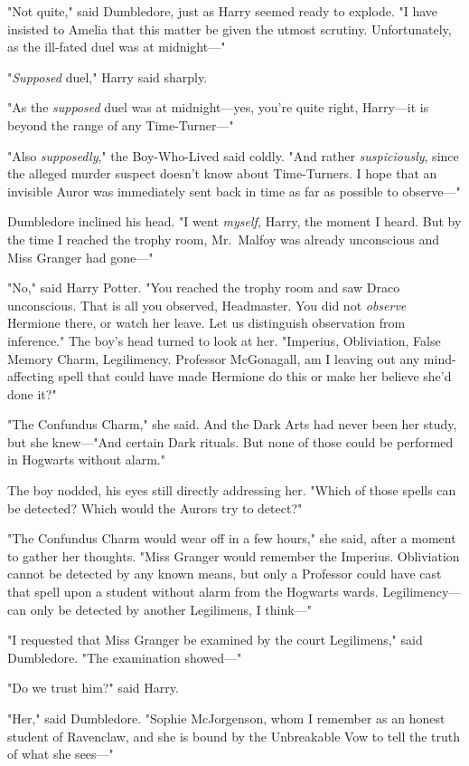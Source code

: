 "Not quite," said Dumbledore, just as Harry seemed ready to explode. "I have 
insisted to Amelia that this matter be given the utmost scrutiny. 
Unfortunately, as the ill-fated duel was at midnight---"

"\emph{Supposed} duel," Harry said sharply.

"As the \emph{supposed} duel was at midnight---yes, you're quite right, 
Harry---it is beyond the range of any Time-Turner---"

"Also \emph{supposedly}," the Boy-Who-Lived said coldly. "And rather 
\emph{suspiciously}, since the alleged murder suspect doesn't know about 
Time-Turners. I hope that an invisible Auror was immediately sent back in time 
as far as possible to observe---"

Dumbledore inclined his head. "I went \emph{myself,} Harry, the moment I heard. 
But by the time I reached the trophy room, Mr.~Malfoy was already unconscious 
and Miss Granger had gone---"

"No," said Harry Potter. "You reached the trophy room and saw Draco 
unconscious. That is all you observed, Headmaster. You did not \emph{observe} 
Hermione there, or watch her leave. Let us distinguish observation from 
inference." The boy's head turned to look at her. "Imperius, Obliviation, False 
Memory Charm, Legilimency. Professor McGonagall, am I leaving out any 
mind-affecting spell that could have made Hermione do this or make her believe 
she'd done it?"

"The Confundus Charm," she said. And the Dark Arts had never been her study, 
but she knew---"And certain Dark rituals. But none of those could be performed 
in Hogwarts without alarm."

The boy nodded, his eyes still directly addressing her. "Which of those spells 
can be detected? Which would the Aurors try to detect?"

"The Confundus Charm would wear off in a few hours," she said, after a moment 
to gather her thoughts. "Miss Granger would remember the Imperius. Obliviation 
cannot be detected by any known means, but only a Professor could have cast 
that spell upon a student without alarm from the Hogwarts wards. 
Legilimency---can only be detected by another Legilimens, I think---"

"I requested that Miss Granger be examined by the court Legilimens," said 
Dumbledore. "The examination showed---"

"Do we trust him?" said Harry.

"Her," said Dumbledore. "Sophie McJorgenson, whom I remember as an honest 
student of Ravenclaw, and she is bound by the Unbreakable Vow to tell the truth 
of what she sees---"

